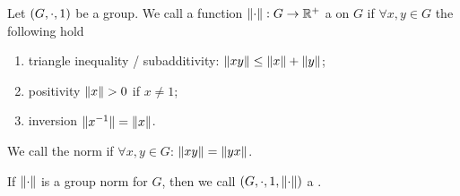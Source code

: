 \begin{definition}
Let $\left( G, \cdot, 1 \right)$ be a group. We call a function $\lVert\cdot\rVert: G\to \mathbb{R}^+$ a  on $G$ if $\forall x,y\in G$ the following hold
\begin{enumerate}
\item triangle inequality / subadditivity: $\lVert xy\rVert \leq \lVert x\rVert + \lVert y\rVert$;
\item positivity $\lVert x\rVert > 0$ if $x \neq 1$;
\item inversion $\lVert x^{-1}\rVert = \lVert x\rVert$.
\end{enumerate}
We call the norm  if $\forall x,y\in G$: $\lVert xy\rVert = \lVert yx\rVert$.

If $\lVert\cdot\rVert$ is a group norm for $G$, then we call $\left( G, \cdot, 1, \lVert\cdot\rVert \right)$ a .
\end{definition}
